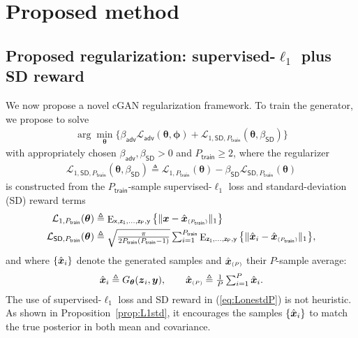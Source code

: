 \documentclass{article}
\theoremstyle{plain}
\theoremstyle{definition}
\theoremstyle{remark}
\newcommand{\defn}{\triangleq}
\newcommand{\hvec}[1]{\ensuremath{\Hat{\boldsymbol{#1}}}}
\renewcommand{\vec}[1]{\ensuremath{\boldsymbol{#1}}}
\newcommand{\mc}[1]{\ensuremath{\mathcal{#1}}}
\DeclareMathOperator{\E}{E}
\renewcommand{\eqref}[1]{(\ref{eq:#1})}
\newcommand{\propref}[1]{Proposition~\ref{prop:#1}}
\newcommand{\ExzPy}{\E_{\mathsf{x,z_1,...,z_P,y}}}
\newcommand{\EzPy}{\E_{\mathsf{z_1,...,z_P,y}}}
\newcommand{\train}{_{\mathsf{train}}}
\newcommand{\Ladv}{\mc{L}_{\mathsf{adv}}}
\newcommand{\LonePt}{\mc{L}_{1,P\train}}
\newcommand{\LstdPt}{\mc{L}_{\mathsf{SD},P\train}}
\newcommand{\LonestdPt}{\mc{L}_{1,\mathsf{SD},P\train}}
\newcommand{\betaadv}{\beta_{\mathsf{adv}}}
\newcommand{\betastd}{\beta_{\mathsf{SD}}}
\newcommand{\avgP}{_{\scriptscriptstyle (P)}}
\newcommand{\avgPt}{_{\scriptscriptstyle (P\train)}}
\begin{document}
\section{Proposed method} \label{sec:proposed}

\subsection{Proposed regularization: supervised-\texorpdfstring{$\ell_1$}{L1} plus SD reward} \label{sec:L1}

We now propose a novel cGAN regularization framework.
To train the generator, we propose to solve
\begin{align}\textstyle
\arg\min_{\vec{\theta}} \{\betaadv\Ladv(\vec{\theta},\vec{\phi})+\LonestdPt(\vec{\theta},\betastd)\}
\end{align}
with appropriately chosen $\betaadv,\betastd>0$ and $P\train\geq 2$, where the regularizer
\begin{align}\textstyle
\LonestdPt(\vec{\theta},\betastd) \defn \LonePt(\vec{\theta}) - \betastd\LstdPt(\vec{\theta})
\label{eq:LonestdP}
\end{align}
is constructed from the $P\train$-sample supervised-$\ell_1$ loss and standard-deviation (SD) reward terms 
\begin{align}
\LonePt(\vec{\theta})
&\defn \textstyle \ExzPy\big\{ \|\vec{x}-\hvec{x}\avgPt\|_1\big\}
\label{eq:LoneP} \\
\LstdPt(\vec{\theta})
&\defn \textstyle \sqrt{\frac{\pi}{2P\train(P\train-1)}} \sum_{i=1}^{P\train} \EzPy\big\{ \|\hvec{x}_i-\hvec{x}\avgPt\|_1 \big\}
\label{eq:LstdP} ,
\end{align}
and where $\{\hvec{x}_i\}$ denote the generated samples and $\hvec{x}\avgP$ their $P$-sample average:
\begin{align}
\hvec{x}_i \defn G_{\vec{\theta}}(\vec{z}_i,\vec{y}),
\qquad
\hvec{x}\avgP \defn \textstyle \frac{1}{P} \sum_{i=1}^P \hvec{x}_i
\label{eq:xhat}. 
\end{align}
The use of supervised-$\ell_1$ loss and SD reward in \eqref{LonestdP} is not heuristic.
As shown in \propref{L1std}, it encourages the samples $\{\hvec{x}_i\}$ to match the true posterior in both mean and covariance.
\end{document}
